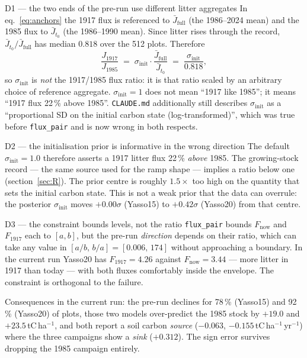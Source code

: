 \documentclass[11pt]{article}
\newcommand{\sinit}{\sigma_{\mathrm{init}}}
\newcommand{\Jfull}{\bar{J}_{\mathrm{full}}}
\newcommand{\Jto}{\bar{J}_{t_0}}
\begin{document}
\begin{defect}{D1 --- the two ends of the pre-run use different litter aggregates}
In eq.~\eqref{eq:anchors} the 1917 flux is referenced to $\Jfull$ (the 1986--2024 mean) and the
1985 flux to $\Jto$ (the 1986--1990 mean). Since litter rises through the record,
$\Jto/\Jfull$ has median $0.818$ over the 512 plots. Therefore
\[
\frac{J_{1917}}{J_{1985}} \;=\; \sinit \cdot \frac{\Jfull}{\Jto} \;=\; \frac{\sinit}{0.818},
\]
so $\sinit$ is \emph{not} the 1917/1985 flux ratio: it is that ratio scaled by an arbitrary
choice of reference aggregate. $\sinit = 1$ does not mean ``1917 like 1985''; it means ``1917
flux 22\,\% above 1985''. \texttt{CLAUDE.md} additionally still describes $\sinit$ as a
``proportional SD on the initial carbon state (log-transformed)'', which was true before
\texttt{flux\_pair} and is now wrong in both respects.
\end{defect}

\begin{defect}{D2 --- the initialisation prior is informative in the wrong direction}
The default $\sinit = 1.0$ therefore asserts a 1917 litter flux 22\,\% \emph{above} 1985.
The growing-stock record --- the same source used for the ramp shape --- implies a ratio below
one (section~\ref{sec:R}). The prior centre is roughly $1.5\times$ too high on the quantity
that sets the initial carbon state. This is not a weak prior that the data can overrule: the
posterior $\sinit$ moves $+0.00\sigma$ (Yasso15) to $+0.42\sigma$ (Yasso20) from that centre.
\end{defect}

\begin{defect}{D3 --- the constraint bounds levels, not the ratio}
\texttt{flux\_pair} bounds $F_{\mathrm{now}}$ and $F_{1917}$ each to $[a,b]$, but the pre-run
\emph{direction} depends on their ratio, which can take any value in $[a/b,\,b/a] = [0.006,\,174]$
without approaching a boundary. In the current run Yasso20 has $F_{1917} = 4.26$ against
$F_{\mathrm{now}} = 3.44$ --- more litter in 1917 than today --- with both fluxes comfortably
inside the envelope. The constraint is orthogonal to the failure.

Consequences in the current run: the pre-run declines for 78\,\% (Yasso15) and 92\,\% (Yasso20)
of plots, those two models over-predict the 1985 stock by $+19.0$ and $+23.5$\,tC\,ha$^{-1}$,
and both report a soil carbon \emph{source} ($-0.063$, $-0.155$\,tC\,ha$^{-1}$\,yr$^{-1}$)
where the three campaigns show a \emph{sink} ($+0.312$). The sign error survives dropping the
1985 campaign entirely.
\end{defect}
\end{document}
